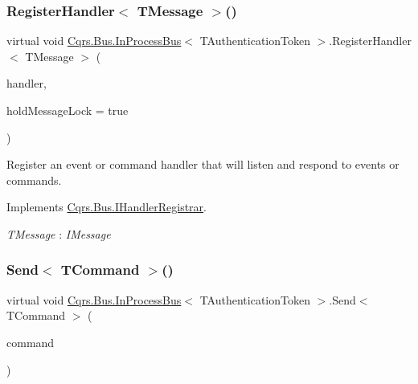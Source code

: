 \subsubsection{\texorpdfstring{Register\+Handler$<$ T\+Message $>$()}{RegisterHandler< TMessage >()}\hspace{0.1cm}{\footnotesize\ttfamily [2/2]}}
{\footnotesize\ttfamily virtual void \hyperlink{classCqrs_1_1Bus_1_1InProcessBus}{Cqrs.\+Bus.\+In\+Process\+Bus}$<$ T\+Authentication\+Token $>$.Register\+Handler$<$ T\+Message $>$ (\begin{DoxyParamCaption}\item[{Action$<$ T\+Message $>$}]{handler,  }\item[{bool}]{hold\+Message\+Lock = {\ttfamily true} }\end{DoxyParamCaption})\hspace{0.3cm}{\ttfamily [virtual]}}



Register an event or command handler that will listen and respond to events or commands. 



Implements \hyperlink{interfaceCqrs_1_1Bus_1_1IHandlerRegistrar_a07792dcc9a8b272709ff2e2dd336a642}{Cqrs.\+Bus.\+I\+Handler\+Registrar}.

\begin{Desc}
\item[Type Constraints]\begin{description}
\item[{\em T\+Message} : {\em I\+Message}]\end{description}
\end{Desc}
\mbox{\label{classCqrs_1_1Bus_1_1InProcessBus_a6a074ef3663d2855875307b106fe4416}} 
\subsubsection{\texorpdfstring{Send$<$ T\+Command $>$()}{Send< TCommand >()}\hspace{0.1cm}{\footnotesize\ttfamily [1/2]}}
{\footnotesize\ttfamily virtual void \hyperlink{classCqrs_1_1Bus_1_1InProcessBus}{Cqrs.\+Bus.\+In\+Process\+Bus}$<$ T\+Authentication\+Token $>$.Send$<$ T\+Command $>$ (\begin{DoxyParamCaption}\item[{T\+Command}]{command }\end{DoxyParamCaption})\hspace{0.3cm}{\ttfamily [virtual]}}



